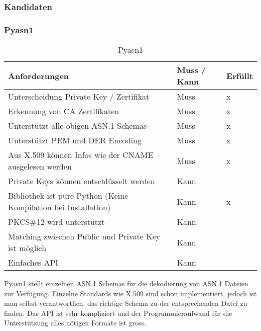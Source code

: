 \subsubsection{Kandidaten}
\subsubsection{Pyasn1}
\begin{table}[H]
\centering
    \begin{tabular}{|p{12cm}|l|l|}
    \hline
    \rowcolor{lightblue}
    Anforderungen & Muss / Kann & Erfüllt   \\ \hline
	Unterscheidung Private Key / Zertifikat	&	Muss & x \\ \hline	
	Erkennung von CA Zertifikaten	&	Muss	& x \\ \hline	
	Unterstützt alle obigen ASN.1 Schemas	&	Muss	& x \\ \hline		
	Unterstützt PEM und DER Encoding	&	Muss	& x \\ \hline	
	Aus X.509 können Infos wie der CNAME ausgelesen werden &	Muss	& x \\ \hline	
	Private Keys können entschlüsselt werden &	Kann &  \\ \hline
	Bibliothek ist pure Python (Keine Kompilation bei Installation) &	Kann	&  x \\ \hline
	PKCS\#12 wird unterstützt &	Kann &  \\ \hline
	Matching zwischen Public und Private Key ist möglich &	Kann &  \\ \hline
	Einfaches API &	Kann &  \\ \hline
	\end{tabular}
    \caption[Pyasn1]{Pyasn1}
\end{table}

Pyasn1 stellt einzelnen ASN.1 Schemas für die dekodierung von ASN.1 Dateien zur Verfügung. Einzelne Standards wie X.509 sind schon implementiert, jedoch ist man selbst verantwortlich, das richtige Schema zu der entsprechenden Datei zu finden. Das API ist sehr kompliziert und der Programmieraufwand für die Unterstützung alles nötigen Formate ist gross.


